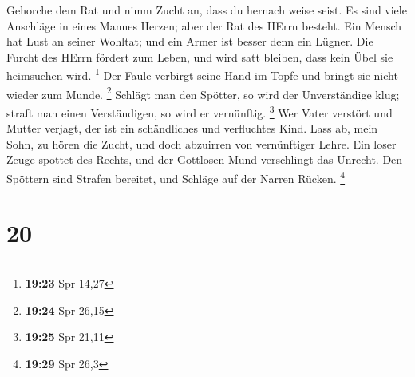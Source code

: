  Gehorche dem Rat und nimm Zucht an, dass du hernach weise
seist.  Es sind viele Anschläge in eines Mannes Herzen;
aber der Rat des HErrn besteht.  Ein Mensch hat Lust an
seiner Wohltat; und ein Armer ist besser denn ein Lügner. 
Die Furcht des HErrn fördert zum Leben, und wird satt bleiben, dass kein
Übel sie heimsuchen wird. \footnote{\textbf{19:23} Spr 14,27}
 Der Faule verbirgt seine Hand im Topfe und bringt sie
nicht wieder zum Munde. \footnote{\textbf{19:24} Spr 26,15}
 Schlägt man den Spötter, so wird der Unverständige klug;
straft man einen Verständigen, so wird er vernünftig. \footnote{\textbf{19:25}
  Spr 21,11}  Wer Vater verstört und Mutter verjagt, der
ist ein schändliches und verfluchtes Kind.  Lass ab, mein
Sohn, zu hören die Zucht, und doch abzuirren von vernünftiger Lehre.
 Ein loser Zeuge spottet des Rechts, und der Gottlosen Mund
verschlingt das Unrecht.  Den Spöttern sind Strafen
bereitet, und Schläge auf der Narren Rücken. \footnote{\textbf{19:29}
  Spr 26,3}

\hypertarget{section-8}{%
\section{20}\label{section-8}}

